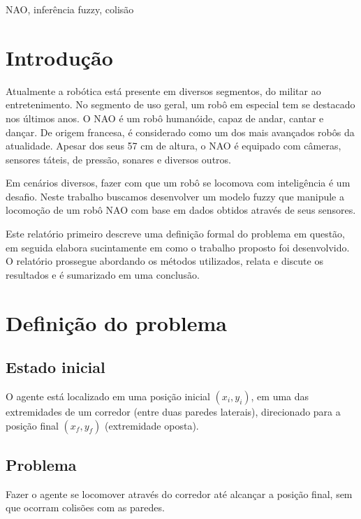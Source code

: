 \documentclass[twoside,conference,a4paper]{IEEEtran}
\begin{document}
\begin{IEEEkeywords}
NAO, inferência fuzzy, colisão
\end{IEEEkeywords}



\section{Introdução}

Atualmente a robótica está presente em diversos segmentos, do militar ao entretenimento. No segmento de uso geral, um robô em especial tem se destacado nos últimos anos. O NAO é um robô humanóide, capaz de andar, cantar e dançar. De origem francesa, é considerado como um dos mais avançados robôs da atualidade. Apesar dos seus 57 cm de altura, o NAO é equipado com câmeras, sensores táteis, de pressão, sonares e diversos outros.

Em cenários diversos, fazer com que um robô se locomova com inteligência é um desafio. Neste trabalho buscamos desenvolver um modelo fuzzy que manipule a locomoção de um robô NAO com base em dados obtidos através de seus sensores.

Este relatório primeiro descreve uma definição formal do problema em questão, em seguida elabora sucintamente em como o trabalho proposto foi desenvolvido. O relatório prossegue abordando os métodos utilizados, relata e discute os resultados e é sumarizado em uma conclusão.


\section{Definição do problema}

\subsection{Estado inicial}
O agente está localizado em uma posição inicial $(x_i, y_i)$, em uma das extremidades de um corredor (entre duas paredes laterais), direcionado para a posição final $(x_f, y_f)$ (extremidade oposta).

\subsection{Problema}
Fazer o agente se locomover através do corredor até alcançar a posição final, sem que ocorram colisões com as paredes.
\end{document}
